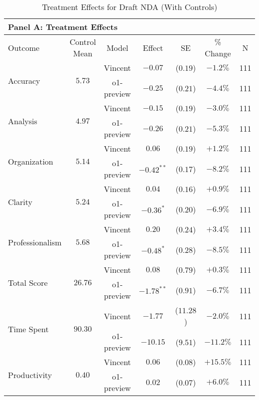 \begin{table}[!htbp]
\centering
\caption{Treatment Effects for Draft NDA (With Controls)}
\label{tab:task4_effects_controls}
\vspace{0.3cm}
\begin{tabular}{lcccccc}
\multicolumn{7}{l}{\textbf{Panel A: Treatment Effects}} \\
\hline\hline
Outcome & Control Mean & Model & Effect & SE & \% Change & N \\
\hline
\multirow{2}{*}{Accuracy} & \multirow{2}{*}{$5.73$} & Vincent & $-0.07$ & ($0.19$) & $-1.2\%$ & 111 \\
& & o1-preview & $-0.25$ & ($0.21$) & $-4.4\%$ & 111 \\
\hline
\multirow{2}{*}{Analysis} & \multirow{2}{*}{$4.97$} & Vincent & $-0.15$ & ($0.19$) & $-3.0\%$ & 111 \\
& & o1-preview & $-0.26$ & ($0.21$) & $-5.3\%$ & 111 \\
\hline
\multirow{2}{*}{Organization} & \multirow{2}{*}{$5.14$} & Vincent & $0.06$ & ($0.19$) & $+1.2\%$ & 111 \\
& & o1-preview & $-0.42^{**}$ & ($0.17$) & $-8.2\%$ & 111 \\
\hline
\multirow{2}{*}{Clarity} & \multirow{2}{*}{$5.24$} & Vincent & $0.04$ & ($0.16$) & $+0.9\%$ & 111 \\
& & o1-preview & $-0.36^{*}$ & ($0.20$) & $-6.9\%$ & 111 \\
\hline
\multirow{2}{*}{Professionalism} & \multirow{2}{*}{$5.68$} & Vincent & $0.20$ & ($0.24$) & $+3.4\%$ & 111 \\
& & o1-preview & $-0.48^{*}$ & ($0.28$) & $-8.5\%$ & 111 \\
\hline
\multirow{2}{*}{Total Score} & \multirow{2}{*}{$26.76$} & Vincent & $0.08$ & ($0.79$) & $+0.3\%$ & 111 \\
& & o1-preview & $-1.78^{**}$ & ($0.91$) & $-6.7\%$ & 111 \\
\hline
\multirow{2}{*}{Time Spent} & \multirow{2}{*}{$90.30$} & Vincent & $-1.77$ & ($11.28$) & $-2.0\%$ & 111 \\
& & o1-preview & $-10.15$ & ($9.51$) & $-11.2\%$ & 111 \\
\hline
\multirow{2}{*}{Productivity} & \multirow{2}{*}{$0.40$} & Vincent & $0.06$ & ($0.08$) & $+15.5\%$ & 111 \\
& & o1-preview & $0.02$ & ($0.07$) & $+6.0\%$ & 111 \\
\hline
\end{tabular}


\end{table}
